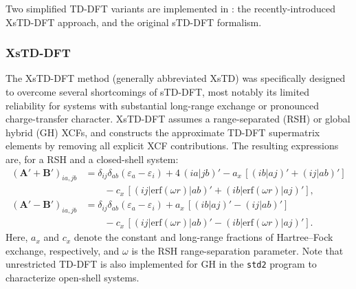 \documentclass[%
 aip,
 amsmath,amssymb,
preprint,%
]{revtex4-2}
\begin{document}
Two simplified TD-DFT variants are implemented in : the recently-introduced XsTD-DFT approach,\cite{dewergifosseEXactIntegralSimplified2024,dewergifosseComputingExcitedStates2024} and the original sTD-DFT formalism.\cite{bannwarthSimplifiedTimedependentDensity2014}  

\subsubsection{XsTD-DFT}

The XsTD-DFT method (generally abbreviated XsTD) was specifically designed to overcome several shortcomings of sTD-DFT, most notably its limited reliability for systems with substantial long-range exchange or pronounced charge-transfer character.  
XsTD-DFT assumes a range-separated (RSH) or global hybrid (GH) XCFs,\cite{dewergifosseEXactIntegralSimplified2024,dewergifosseComputingExcitedStates2024} and constructs the approximate TD-DFT supermatrix elements by removing all explicit XCF contributions. The resulting expressions are, for a RSH and a closed-shell system:
\begin{align}
	(\mathbf A'+ \mathbf B')_{ia,jb} &=  \delta_{ij}\delta_{ab} (\varepsilon_a - \varepsilon_i)
	+ 4\,(ia|jb)' - a_x\,[(ib|aj)'+(ij|ab)'] \nonumber\\&\hspace{2em}- c_x\,[(ij|\mathrm{erf}(\omega r)|ab)'+ (ib|\mathrm{erf}(\omega r)|aj)'],\nonumber\\
	(\mathbf A'-\mathbf B')_{ia,jb} &= \delta_{ij}\delta_{ab} (\varepsilon_a - \varepsilon_i)+  a_x\,[(ib|aj)'  - (ij|ab)'] \nonumber\\&\hspace{2em}-c_x\,[(ij|\mathrm{erf}(\omega r)|ab)'-(ib|\mathrm{erf}(\omega r)|aj)'] . 
	\label{eq:xstddft}
\end{align}
Here, $a_x$ and $c_x$ denote the constant and long-range fractions of Hartree--Fock exchange, respectively, and $\omega$ is the RSH range-separation parameter.
Note that unrestricted TD-DFT is also implemented for GH in the \texttt{std2} program to characterize open-shell systems.
\end{document}
